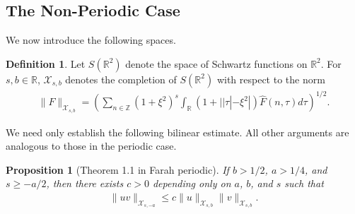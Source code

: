 \documentclass[12pt,reqno]{amsart}
\numberwithin{equation}{section}  %
\numberwithin{figure}{section}
\newcommand{\rr}{\mathbb{R}}
\newcommand{\zz}{\mathbb{Z}}
\newcommand{\wh}{\widehat}
\theoremstyle{plain}
\newtheorem{proposition}{Proposition}
\theoremstyle{definition}
\newtheorem{definition}{Definition}
\theoremstyle{remark}
\begin{document}
\subsection{The Non-Periodic Case} 
\label{ssec:non-periodic-case}
We now introduce the following spaces. 
%
%
\begin{definition}
  Let $S(\rr^{2})$ denote the space of Schwartz functions on
  $\rr^{2}$.  For $s, b \in \rr$, $\mathcal{X}_{s,b}$
  denotes the completion of $S(\rr^{2})$ with
  respect to the norm
  \begin{equation}
  \begin{split}
    \|F\|_{\mathcal{X}_{s,b}} = \left( \sum_{n \in \zz} (1 + \xi^{2})^{s} \int_{\rr}
    (1 + | | \tau | - \xi^{2} |) \wh{F}(n, \tau) d \tau\right)^{1/2}.
  \end{split}
  \label{eqn:bous-norm-real}
  \end{equation}
\end{definition}
%
%
We need only establish the following bilinear estimate. All other arguments are
analogous to those in the periodic case.
%
\begin{proposition}[Theorem 1.1 in Farah periodic]
\label{prop:bilin-est-real}
If $b > 1/2$, $a > 1/4$, and $s \ge -a/2$, 
  then there exists $c > 0$ depending only on $a$, $b$, and $s$ such that
  \begin{equation*}
  \begin{split}
    \| uv \|_{\mathcal{X}_{s,-a}} \le c \| u \|_{\mathcal{X}_{s,b}} \| v \|_{\mathcal{X}_{s,b}}.
  \end{split}
  \end{equation*}
\end{proposition}
\end{document}
